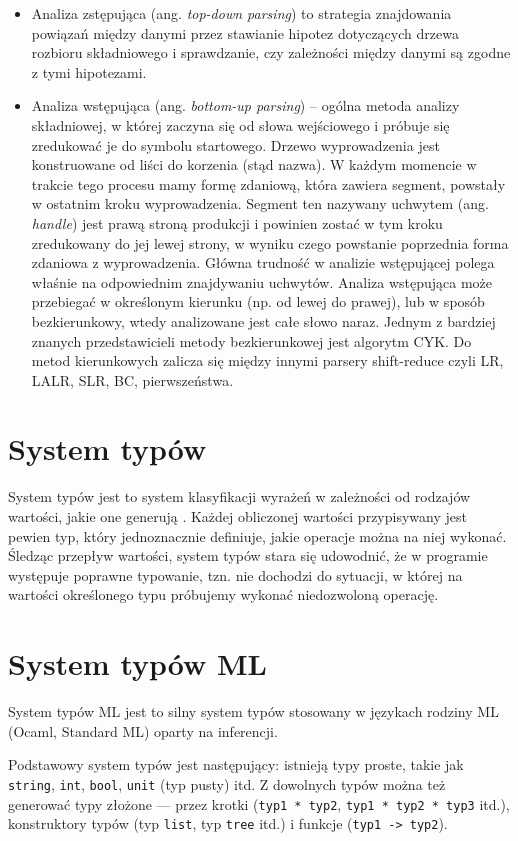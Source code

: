 \documentclass[a4paper,12pt]{book} %
\begin{document}
\begin{itemize}
  \item Analiza zstępująca (ang. \emph{top-down parsing}) to strategia znajdowania powiązań między danymi przez stawianie hipotez dotyczących drzewa rozbioru składniowego i sprawdzanie, czy zależności między danymi są zgodne z tymi hipotezami.
  \item Analiza wstępująca (ang. \emph{bottom-up parsing}) – ogólna metoda analizy składniowej, w której zaczyna się od słowa wejściowego i próbuje się zredukować je do symbolu startowego. Drzewo wyprowadzenia jest konstruowane od liści do korzenia (stąd nazwa). W każdym momencie w trakcie tego procesu mamy formę zdaniową, która zawiera segment, powstały w ostatnim kroku wyprowadzenia. Segment ten nazywany uchwytem (ang. \emph{handle}) jest prawą stroną produkcji i powinien zostać w tym kroku zredukowany do jej lewej strony, w wyniku czego powstanie poprzednia forma zdaniowa z wyprowadzenia. Główna trudność w analizie wstępującej polega właśnie na odpowiednim znajdywaniu uchwytów.
        Analiza wstępująca może przebiegać w określonym kierunku (np. od lewej do prawej), lub w sposób bezkierunkowy, wtedy analizowane jest całe słowo naraz. Jednym z bardziej znanych przedstawicieli metody bezkierunkowej jest algorytm CYK. Do metod kierunkowych zalicza się między innymi parsery shift-reduce czyli LR, LALR, SLR, BC, pierwszeństwa.
\end{itemize}



\section{System typów}
System typów jest to system klasyfikacji wyrażeń w zależności od rodzajów wartości, jakie one generują \cite{Pierce__Benjamin__C__2002}. Każdej obliczonej wartości przypisywany jest pewien typ, który jednoznacznie definiuje, jakie operacje można na niej wykonać. Śledząc przepływ wartości, system typów stara się udowodnić, że w programie występuje poprawne typowanie, tzn. nie dochodzi do sytuacji, w której na wartości określonego typu próbujemy wykonać niedozwoloną operację.
\section{System typów ML} System typów ML jest to silny system typów stosowany w językach rodziny ML (Ocaml, Standard ML) oparty na inferencji.

Podstawowy system typów jest następujący: istnieją typy proste, takie jak \lstinline$string$, \lstinline$int$, \lstinline$bool$, \lstinline$unit$ (typ pusty) itd. Z dowolnych typów można też generować typy złożone –-- przez krotki (\lstinline$typ1 * typ2$, \lstinline$typ1 * typ2 * typ3$ itd.), konstruktory typów (typ \lstinline$list$, typ \lstinline$tree$ itd.) i funkcje (\lstinline$typ1 -> typ2$).
\end{document}
